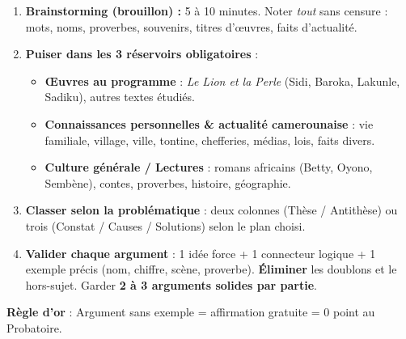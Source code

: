 \documentclass[11pt]{article}
\begin{document}
\begin{methode}
\begin{enumerate}
\item \textbf{Brainstorming (brouillon) :} 5 à 10 minutes. Noter \emph{tout} sans censure : mots, noms, proverbes, souvenirs, titres d'œuvres, faits d'actualité.
\item \textbf{Puiser dans les 3 réservoirs obligatoires} :
  \begin{itemize}
  \item \textbf{Œuvres au programme} : \emph{Le Lion et la Perle} (Sidi, Baroka, Lakunle, Sadiku), autres textes étudiés.
  \item \textbf{Connaissances personnelles \& actualité camerounaise} : vie familiale, village, ville, tontine, chefferies, médias, lois, faits divers.
  \item \textbf{Culture générale / Lectures} : romans africains (Betty, Oyono, Sembène), contes, proverbes, histoire, géographie.
  \end{itemize}
\item \textbf{Classer selon la problématique} : deux colonnes (Thèse / Antithèse) ou trois (Constat / Causes / Solutions) selon le plan choisi.
\item \textbf{Valider chaque argument} : 1 idée force + 1 connecteur logique + 1 exemple précis (nom, chiffre, scène, proverbe). \textbf{Éliminer} les doublons et le hors-sujet. Garder \textbf{2 à 3 arguments solides par partie}.
\end{enumerate}
\textbf{Règle d'or} : Argument sans exemple = affirmation gratuite = 0 point au Probatoire.
\end{methode}
\end{document}
